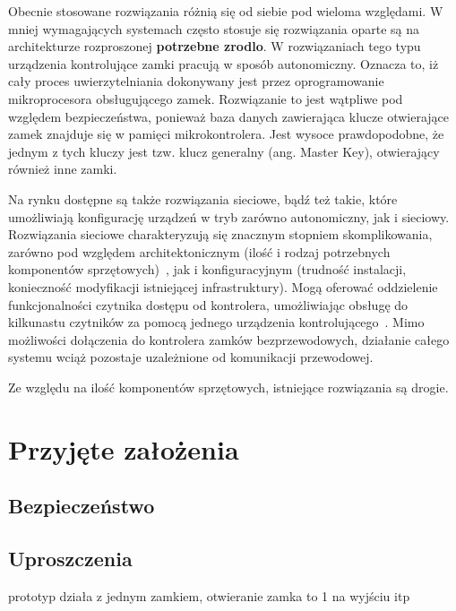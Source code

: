 Obecnie stosowane rozwiązania różnią się od siebie pod wieloma względami. W mniej wymagających systemach często stosuje się rozwiązania oparte są na architekturze rozproszonej \textbf{potrzebne zrodlo}. W rozwiązaniach tego typu urządzenia kontrolujące zamki pracują w sposób autonomiczny. Oznacza to, iż cały proces uwierzytelniania dokonywany jest przez oprogramowanie mikroprocesora obsługującego zamek. Rozwiązanie to jest wątpliwe pod względem bezpieczeństwa, ponieważ baza danych zawierająca klucze otwierające zamek znajduje się w pamięci mikrokontrolera. Jest wysoce prawdopodobne, że jednym z tych kluczy jest tzw. klucz generalny (ang. Master Key), otwierający również inne zamki.

Na rynku dostępne są także rozwiązania sieciowe, bądź też takie, które umożliwiają konfigurację urządzeń w tryb zarówno autonomiczny, jak i sieciowy. Rozwiązania sieciowe charakteryzują się znacznym stopniem skomplikowania, zarówno pod względem architektonicznym (ilość i rodzaj potrzebnych komponentów sprzętowych)~\cite{racs5}, jak i konfiguracyjnym (trudność instalacji, konieczność modyfikacji istniejącej infrastruktury). Mogą oferować oddzielenie funkcjonalności czytnika dostępu od kontrolera, umożliwiając obsługę do kilkunastu czytników za pomocą jednego urządzenia kontrolującego~\cite{racs5}. Mimo możliwości dołączenia do kontrolera zamków bezprzewodowych, działanie całego systemu wciąż pozostaje uzależnione od komunikacji przewodowej.

Ze względu na ilość komponentów sprzętowych, istniejące rozwiązania są drogie.

\section{Przyjęte założenia}

\subsection{Bezpieczeństwo}

\subsection{Uproszczenia}
prototyp działa z jednym zamkiem, otwieranie zamka to 1 na wyjściu itp